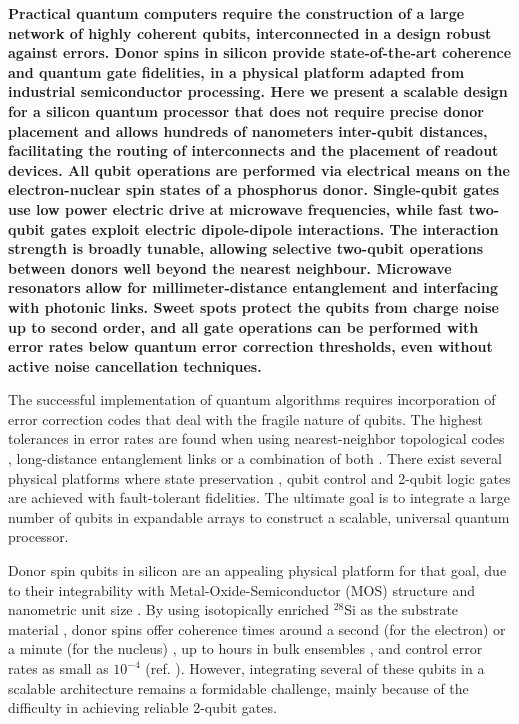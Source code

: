 \documentclass[aps,prb,superscriptaddress,nobibnotes,twocolumn]{revtex4-1}
\begin{document}
\textbf{Practical quantum computers require the construction of a large network of highly coherent qubits, interconnected in a design robust against errors. Donor spins in silicon provide state-of-the-art coherence and quantum gate fidelities, in a physical platform adapted from industrial semiconductor processing. Here we present a scalable design for a silicon quantum processor that does not require precise donor placement and allows hundreds of nanometers inter-qubit distances, facilitating the routing of interconnects and the placement of readout devices. All qubit operations are performed via electrical means on the electron-nuclear spin states of a phosphorus donor. Single-qubit gates use low power electric drive at microwave frequencies, while fast two-qubit gates exploit electric dipole-dipole interactions. The interaction strength is broadly tunable, allowing selective two-qubit operations between donors well beyond the nearest neighbour. Microwave resonators allow for millimeter-distance entanglement and interfacing with photonic links. Sweet spots protect the qubits from charge noise up to second order, and all gate operations can be performed with error rates below quantum error correction thresholds, even without active noise cancellation techniques.}
\vspace{1.5mm}


The successful implementation of quantum algorithms requires incorporation of error correction codes \cite{Terhal2015} that deal with the fragile nature of qubits. The highest tolerances in error rates are found when using nearest-neighbor topological codes \cite{Fowler2012}, long-distance entanglement links \cite{Knill2005} or a combination of both \cite{Nickerson2013}. There exist several physical platforms where state preservation \cite{Maurer2012,Saeedi2013,Muhonen2014}, qubit control \cite{Barends2014,Harty2014,Veldhorst2014,Muhonen2015} and 2-qubit logic gates \cite{Benhelm2008,Barends2014} are achieved with fault-tolerant fidelities. The ultimate goal is to integrate a large number of qubits in expandable arrays to construct a scalable, universal quantum processor.

Donor spin qubits in silicon are an appealing physical platform for that goal, due to their integrability with Metal-Oxide-Semiconductor (MOS) structure and nanometric unit size \cite{Zwanenburg2013}. By using isotopically enriched $^{28}$Si as the substrate material \cite{Itoh2014}, donor spins offer coherence times around a second (for the electron) or a minute (for the nucleus) \cite{Muhonen2014}, up to hours in bulk ensembles \cite{Saeedi2013}, and control error rates as small as $10^{-4}$ (ref. ). However, integrating several of these qubits in a scalable architecture remains a formidable challenge, mainly because of the difficulty in achieving reliable 2-qubit gates.
\end{document}
